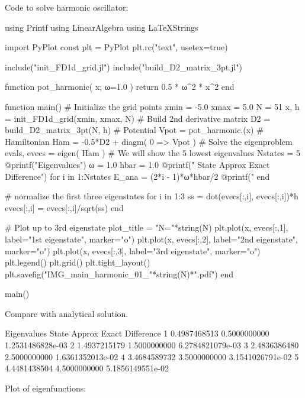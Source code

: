 Code to solve harmonic oscillator:

\begin{juliacode}
using Printf
using LinearAlgebra
using LaTeXStrings
  
import PyPlot
const plt = PyPlot
plt.rc("text", usetex=true)

include("init_FD1d_grid.jl")
include("build_D2_matrix_3pt.jl")
  
function pot_harmonic( x; ω=1.0 )
  return 0.5 * ω^2 * x^2
end
  
function main()
  # Initialize the grid points
  xmin = -5.0
  xmax =  5.0
  N = 51
  x, h = init_FD1d_grid(xmin, xmax, N)
  # Build 2nd derivative matrix
  D2 = build_D2_matrix_3pt(N, h)
  # Potential
  Vpot = pot_harmonic.(x)
  # Hamiltonian
  Ham = -0.5*D2 + diagm( 0 => Vpot )
  # Solve the eigenproblem
  evals, evecs = eigen( Ham )
  # We will show the 5 lowest eigenvalues
  Nstates = 5
  @printf("Eigenvalues\n")
  ω = 1.0
  hbar = 1.0
  @printf(" State         Approx              Exact          Difference\n")
  for i in 1:Nstates
    E_ana = (2*i - 1)*ω*hbar/2
    @printf("%
  end
  
  # normalize the first three eigenstates
  for i in 1:3
    ss = dot(evecs[:,i], evecs[:,i])*h
    evecs[:,i] = evecs[:,i]/sqrt(ss)
  end
  
  # Plot up to 3rd eigenstate
  plot_title = "N="*string(N)
  plt.plot(x, evecs[:,1], label="1st eigenstate", marker="o")
  plt.plot(x, evecs[:,2], label="2nd eigenstate", marker="o")
  plt.plot(x, evecs[:,3], label="3rd eigenstate", marker="o")
  plt.legend()
  plt.grid()
  plt.tight_layout()
  plt.savefig("IMG_main_harmonic_01_"*string(N)*".pdf")
end

main()
\end{juliacode}

Compare with analytical solution.
\begin{textcode}
Eigenvalues
State         Approx              Exact          Difference
   1       0.4987468513       0.5000000000   1.2531486828e-03
   2       1.4937215179       1.5000000000   6.2784821079e-03
   3       2.4836386480       2.5000000000   1.6361352013e-02
   4       3.4684589732       3.5000000000   3.1541026791e-02
   5       4.4481438504       4.5000000000   5.1856149551e-02 
\end{textcode}

Plot of eigenfunctions:

